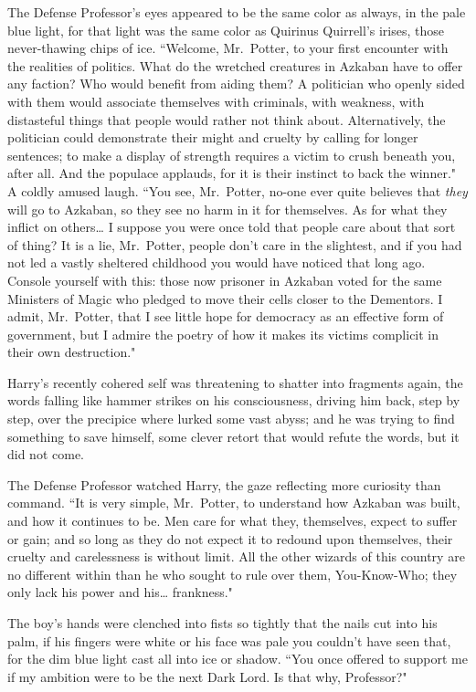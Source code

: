 The Defense Professor's eyes appeared to be the same color as always, in the pale blue light, for that light was the same color as Quirinus Quirrell's irises, those never-thawing chips of ice. ``Welcome, Mr.~Potter, to your first encounter with the realities of politics. What do the wretched creatures in Azkaban have to offer any faction? Who would benefit from aiding them? A politician who openly sided with them would associate themselves with criminals, with weakness, with distasteful things that people would rather not think about. Alternatively, the politician could demonstrate their might and cruelty by calling for longer sentences; to make a display of strength requires a victim to crush beneath you, after all. And the populace applauds, for it is their instinct to back the winner." A coldly amused laugh. ``You see, Mr.~Potter, no-one ever quite believes that \emph{they} will go to Azkaban, so they see no harm in it for themselves. As for what they inflict on others{\ldots} I suppose you were once told that people care about that sort of thing? It is a lie, Mr.~Potter, people don't care in the slightest, and if you had not led a vastly sheltered childhood you would have noticed that long ago. Console yourself with this: those now prisoner in Azkaban voted for the same Ministers of Magic who pledged to move their cells closer to the Dementors. I admit, Mr.~Potter, that I see little hope for democracy as an effective form of government, but I admire the poetry of how it makes its victims complicit in their own destruction."

Harry's recently cohered self was threatening to shatter into fragments again, the words falling like hammer strikes on his consciousness, driving him back, step by step, over the precipice where lurked some vast abyss; and he was trying to find something to save himself, some clever retort that would refute the words, but it did not come.

The Defense Professor watched Harry, the gaze reflecting more curiosity than command. ``It is very simple, Mr.~Potter, to understand how Azkaban was built, and how it continues to be. Men care for what they, themselves, expect to suffer or gain; and so long as they do not expect it to redound upon themselves, their cruelty and carelessness is without limit. All the other wizards of this country are no different within than he who sought to rule over them, You-Know-Who; they only lack his power and his{\ldots} frankness."

The boy's hands were clenched into fists so tightly that the nails cut into his palm, if his fingers were white or his face was pale you couldn't have seen that, for the dim blue light cast all into ice or shadow. ``You once offered to support me if my ambition were to be the next Dark Lord. Is that why, Professor?"

